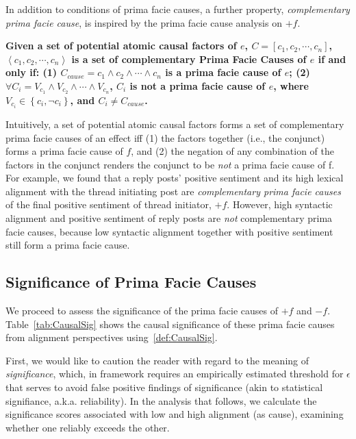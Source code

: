 In addition to conditions of prima facie causes, a further property, \emph{complementary prima facie cause}, is inspired by the prima facie cause analysis on $+f$.
\begin{defn}
\textbf{Given a set of potential atomic causal factors of $e$, $C=[c_{1}, c_{2}, \cdots, c_{n}]$, $\left \langle c_{1}, c_{2}, \cdots , c_{n} \right \rangle$ is a set of complementary Prima Facie Causes of $e$ if and only if: (1) $C_{cause}=c_{1} \wedge c_{2} \wedge \cdots \wedge c_{n}$ is a prima facie cause of $e$; (2) $\forall C_{i}= V_{c_{1}} \wedge V_{c_{2}} \wedge \cdots \wedge V_{c_{n}}$, $C_{i}$ is not a prima facie cause of $e$, where $V_{c_{i}} \in \left \{ c_{i}, \neg c_{i}\right \}$, and $C_{i} \neq C_{cause}$.}
\end{defn}
Intuitively, a set of potential atomic causal factors forms a set of complementary
prima facie causes of an effect iff (1) the factors together (i.e., the conjunct) forms a prima facie cause of $f$, and (2) the negation of any combination of the factors in the conjunct renders the conjunct to be {\em not} a prima facie cause of f. For example, we found that a reply posts' positive sentiment and its high lexical alignment with the thread initiating post are \emph{complementary prima facie causes} of the final positive sentiment of thread initiator, $+f$.
However, high syntactic alignment and positive sentiment of reply posts are {\em not} complementary prima facie causes, because low syntactic alignment together with positive sentiment still form a prima facie cause.



\subsection{Significance of Prima Facie Causes}

We proceed to assess the significance of the prima facie causes of $+f$ and $-f$. Table~\ref{tab:CausalSig} shows the causal significance of these prima facie causes from alignment perspectives using~\ref{def:CausalSig}.

First, we would like to caution the reader with regard to the meaning of \emph{significance}, which, in  framework requires an empirically estimated threshold for $\epsilon$ that serves to avoid false positive findings of significance (akin to statistical signifiance, a.k.a. reliability).  In the analysis that follows, we calculate the significance scores associated with low and high alignment (as cause), examining whether one reliably exceeds the other.

